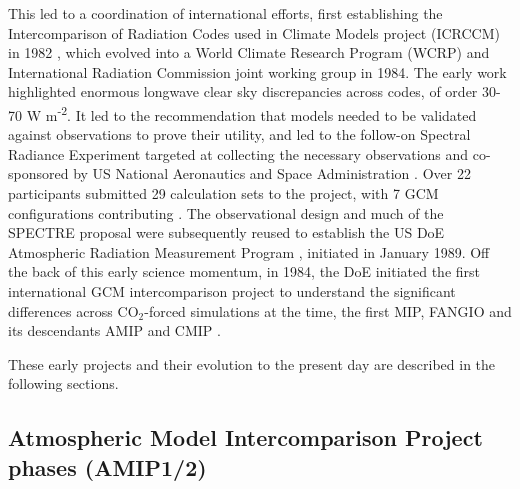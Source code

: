 \documentclass[manuscript]{copernicus}
\newcommand{\mycomment}[1]{}
\begin{document}
This led to a coordination of international efforts, first establishing the Intercomparison of Radiation Codes used in Climate Models project (ICRCCM) in 1982 \citep{luther_intercomparison_1988,ellingson_intercomparison_1991}, which evolved into a World Climate Research Program (WCRP) and International Radiation Commission joint working group in 1984. The early work highlighted enormous longwave clear sky discrepancies across codes, of order 30-70 W m\textsuperscript{-2}. It led to the recommendation that models needed to be validated against observations to prove their utility, and led to the follow-on Spectral Radiance Experiment \citep[SPECTRE;][]{ellingson_icrccm_1990} targeted at collecting the necessary observations and co-sponsored by US National Aeronautics and Space Administration \citep[NASA;][]{ellingson_spectral_1996}. Over 22 participants submitted 29 calculation sets to the project, with 7 GCM configurations contributing \citep{ellingson_atmospheric_2016}. The observational design and much of the SPECTRE proposal were subsequently reused to establish the US DoE Atmospheric Radiation Measurement Program \citep[ARM;][]{us_department_of_energy_atmospheric_1990}, initiated in January 1989. Off the back of this early science momentum, in 1984, the DoE initiated the first international GCM intercomparison project to understand the significant differences across CO$_{2}$-forced simulations at the time, the first MIP, FANGIO and its descendants AMIP and CMIP \citep[see \autoref{sec:amip1And2};][]{ellingson_atmospheric_2016}.

These early projects and their evolution to the present day are described in the following sections.

\mycomment{
1955-65: Establishment of Atmospheric General Circulation Modelling
http://pne.people.si.umich.edu/sloan/1955_65.html
Establishment of the IPCC UNEP 70th plenary meeting 6 December 1988
https://documents.un.org/doc/resolution/gen/nr0/530/32/img/nr053032.pdf?OpenElement
}


\subsection{Atmospheric Model Intercomparison Project phases (AMIP1/2)}
\label{sec:amip1And2}
\end{document}
